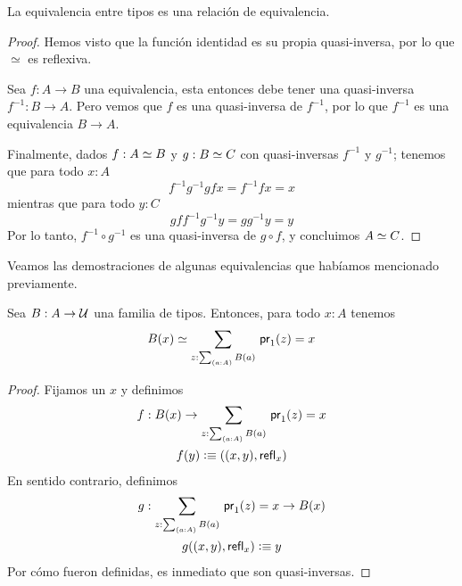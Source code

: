 \documentclass[../main.tex]{subfiles}
\begin{document}
\begin{lemma}
  La equivalencia entre tipos es una relaci\'on de equivalencia.
\end{lemma}
\begin{proof}
  Hemos visto que la función identidad es su propia quasi-inversa, por lo que $\simeq$ es reflexiva.

  Sea $f:A \to B$ una equivalencia, esta entonces debe tener una quasi-inversa $f^{-1}:B\to A$.
  Pero vemos que $f$ es una quasi-inversa de $f^{-1}$, por lo que $f^{-1}$ es una equivalencia $B\to A$.

  Finalmente, dados $f:A \simeq B$ y $g:B \simeq C$ con quasi-inversas $f^{-1}$ y $g^{-1}$; tenemos que para todo $x:A$
  \[ f^{-1} g^{-1} g f x = f^{-1} f x = x\]
  mientras que para todo $y:C$
  \[ g f f^{-1} g^{-1} y = g g^{-1} y = y\]
  Por lo tanto, $f^{-1} \circ g^{-1}$ es una quasi-inversa de $g\circ f$, y concluimos $A \simeq C$.
\end{proof}

Veamos las demostraciones de algunas equivalencias que hab\'iamos mencionado previamente.

\begin{proposition}\label{fibras-eq}
  Sea $B:A \to \mathcal{U}$ una familia de tipos. Entonces, para todo $x:A$ tenemos
  \[ \eqv{B(x)}{\sm{z: \sm{a:A}B(a)}\fst(z)=x} \]
\end{proposition}
\begin{proof}
  Fijamos un $x$ y definimos
  \begin{gather*}
    f     : B(x) \to \sm{z: \sm{a:A}B(a)}\fst(z)=x \\
    f(y)  \defeq ((x,y), \refl{x})
  \end{gather*}
  En sentido contrario, definimos
  \begin{gather*}
    g                  : \sm{z: \sm{a:A}B(a)}\fst(z)=x \to B(x) \\
    g((x,y), \refl{x}) \defeq y
  \end{gather*}
  Por c\'omo fueron definidas, es inmediato que son quasi-inversas.
\end{proof}
\end{document}

